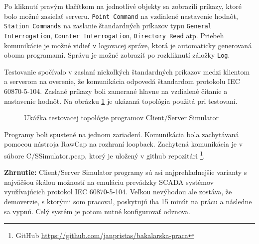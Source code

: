 Po kliknutí pravým tlačítkom na jednotlivé objekty sa zobrazili príkazy, ktoré bolo možné zasielať serveru. {\tt Point Command} na vzdialené nastavenie hodnôt, {\tt Station Commands} na zaslanie štandardných príkazov typu {\tt General Interrogation}, {\tt Counter Interrogation}, {\tt Directory Read} atp. Priebeh komunikácie je možné vidieť v logovacej správe, ktorá je automaticky generovaná oboma programami. Správu je možné zobraziť po rozkliknutí záložky {\tt Log}. \par
Testovanie spočívalo v zaslaní niekoľkých štandardných príkazov medzi klientom a serverom na overenie, že komunikácia odpovedá štandardom protokolu IEC 60870-5-104. Zaslané príkazy boli zamerané hlavne na vzdialené čítanie a nastavenie hodnôt. Na obrázku \ref{iectopology} je ukázaná topológia použitá pri testovaní. 
\begin{figure}[h]
    \centering
    \caption{Ukážka testovacej topológie programov Client/Server Simulator}
\label{iectopology}
\end{figure}
Programy boli spustené na jednom zariadení. Komunikácia bola zachytávaná pomocou nástroja RawCap na rozhraní loopback. Zachytená komunikácia je v súbore C/SSimulator.pcap, ktorý je uložený v github repozitári \footnote{GitHub \url{https://github.com/janpristas/bakalarska-praca}}. \par
\noindent \textbf{Zhrnutie:} Client/Server Simulator programy sú asi najprehladnejšie varianty s najväčšou škálou možností na emuláciu prevádzky SCADA systémov využívajúcich protokol IEC 60870-5-104. Veľkou nevýhodou ale zostáva, že demoverzie, s ktorými som pracoval, poskytujú iba 15 minút na prácu a následne sa vypnú. Celý systém je potom nutné konfigurovať odznova.


